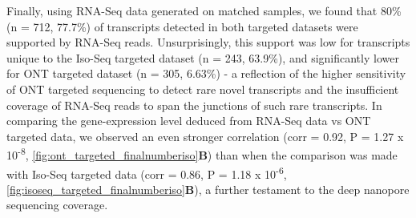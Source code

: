 Finally, using RNA-Seq data generated on matched samples, we found that 80\% (n = 712, 77.7\%) of transcripts detected in both targeted datasets were supported by RNA-Seq reads. Unsurprisingly, this support was low for transcripts unique to the Iso-Seq targeted dataset (n = 243, 63.9\%), and significantly lower for ONT targeted dataset (n = 305, 6.63\%) - a reflection of the higher sensitivity of ONT targeted sequencing to detect rare novel transcripts and the insufficient coverage of RNA-Seq reads to span the junctions of such rare transcripts. In comparing the gene-expression level deduced from RNA-Seq data vs ONT targeted data, we observed an even stronger correlation (corr = 0.92, P = 1.27 x 10\textsuperscript{-8}, \cref{fig:ont_targeted_finalnumberiso}\textbf{B}) than when the comparison was made with Iso-Seq targeted data (corr = 0.86, P = 1.18 x 10\textsuperscript{-6}, \cref{fig:isoseq_targeted_finalnumberiso}\textbf{B}), a further testament to the deep nanopore sequencing coverage.  


